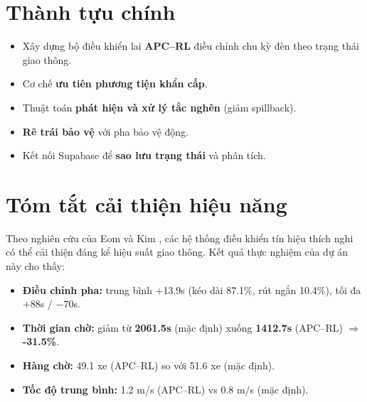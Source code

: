 \section{Thành tựu chính}
\begin{itemize}
    \item Xây dựng bộ điều khiển lai \textbf{APC–RL} điều chỉnh chu kỳ đèn theo trạng thái giao thông.
    \item Cơ chế \textbf{ưu tiên phương tiện khẩn cấp}.
    \item Thuật toán \textbf{phát hiện và xử lý tắc nghẽn} (giảm spillback).
    \item \textbf{Rẽ trái bảo vệ} với pha bảo vệ động.
    \item Kết nối Supabase để \textbf{sao lưu trạng thái} và phân tích.
\end{itemize}

\section{Tóm tắt cải thiện hiệu năng}
Theo nghiên cứu của Eom và Kim \cite{Eom2020}, các hệ thống điều khiển tín hiệu thích nghi có thể cải thiện đáng kể hiệu suất giao thông. Kết quả thực nghiệm của dự án này cho thấy:

\begin{itemize}
    \item \textbf{Điều chỉnh pha:} trung bình +13.9s (kéo dài 87.1\%, rút ngắn 10.4\%), tối đa +88s / $-70$s.
    \item \textbf{Thời gian chờ:} giảm từ \textbf{2061.5s} (mặc định) xuống \textbf{1412.7s} (APC–RL) $\Rightarrow$ \textbf{-31.5\%}.
    \item \textbf{Hàng chờ:} 49.1 xe (APC–RL) so với 51.6 xe (mặc định).
    \item \textbf{Tốc độ trung bình:} 1.2 m/s (APC–RL) vs 0.8 m/s (mặc định).
\end{itemize}

